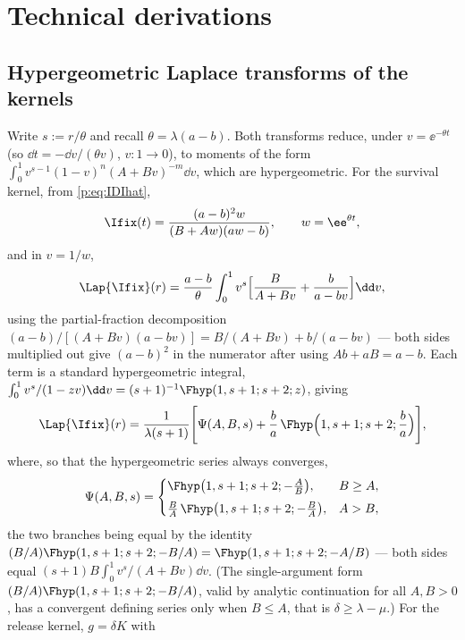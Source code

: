 
\section{Technical derivations}
\label{p:app:technical}

\subsection{Hypergeometric Laplace transforms of the kernels}
\label{p:app:transforms}

Write $s:=r/\theta$ and recall $\theta=\lambda(a-b)$. Both transforms
reduce, under $v=\ee^{-\theta t}$ (so $\dd t=-\dd v/(\theta v)$, $v:1\to0$),
to moments of the form $\int_0^1 v^{s-1}(1-v)^n(A+Bv)^{-m}\dd v$, which are
hypergeometric. For the survival kernel, from \cref{p:eq:IDIhat},
\[
\Ifix(t)=\frac{(a-b)^2w}{(B+Aw)(aw-b)},\qquad w=\ee^{\theta t},
\]
and in $v=1/w$,
\[
\Lap{\Ifix}(r)=\frac{a-b}{\theta}\int_0^1 v^s
\Bigl[\frac{B}{A+Bv}+\frac{b}{a-bv}\Bigr]\dd v,
\]
using the partial-fraction decomposition
$(a-b)/[(A+Bv)(a-bv)]=B/(A+Bv)+b/(a-bv)$ --- both sides multiplied out give
$(a-b)^2$ in the numerator after using $Ab+aB=a-b$. Each term is a standard
hypergeometric integral,
$\int_0^1 v^s/(1-zv)\dd v=(s+1)^{-1}\Fhyp(1,s+1;s+2;z)$, giving
\begin{equation}
\Lap{\Ifix}(r)=\frac{1}{\lambda(s+1)}
\Biggl[
\Psi(A,B,s)
+\frac{b}{a}\,\Fhyp\Bigl(1,s+1;s+2;\frac{b}{a}\Bigr)
\Biggr],
\label{p:eq:LIhat}
\end{equation}
where, so that the hypergeometric series always converges,
\begin{equation}
\Psi(A,B,s)=
\begin{cases}
\Fhyp\bigl(1,s+1;s+2;-\frac{A}{B}\bigr), & B\ge A,\\[0.4em]
\frac{B}{A}\,\Fhyp\bigl(1,s+1;s+2;-\frac{B}{A}\bigr), & A>B,
\end{cases}
\label{p:eq:Psi}
\end{equation}
the two branches being equal by the identity
$(B/A)\Fhyp(1,s+1;s+2;-B/A)=\Fhyp(1,s+1;s+2;-A/B)$ --- both sides equal
$(s+1)B\int_0^1 v^s/(A+Bv)\dd v$. (The single-argument form
$(B/A)\Fhyp(1,s+1;s+2;-B/A)$, valid by analytic continuation for all
$A,B>0$, has a convergent defining series only when $B\le A$, that is
$\delta\ge\lambda-\mu$.) For the release kernel, $g=\delta K$ with
